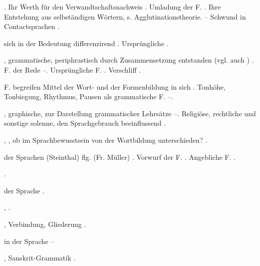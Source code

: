 \begin{register}
.  Ihr Werth für den Verwandtschaftsnachweis \pageref{sp.153}. Umladung der F. \pageref{sp.214}. Ihre Entstehung aus selbständigen Wörtern, s. Agglutinationstheorie. – Schwund in Contactsprachen \pageref{sp.407}.

 sich in der Bedeutung differenzirend \pageref{sp.254}. Ursprüngliche \pageref{sp.361}.

, grammatische, periphrastisch durch   Zusammensetzung entstanden (vgl. auch ) \pageref{sp.241}. F. der Rede \pageref{sp.320}–\pageref{sp.323}. Ursprüngliche F. \pageref{sp.326}. Verschliff \pageref{sp.437}.

  F. begreifen Mittel der Wort- und der Formenbildung in sich \pageref{sp.122}. Tonhöhe, Tonbiegung, Rhythmus, Pausen als grammatische F. \pageref{sp.450}–\pageref{sp.451}.


, graphische, zur Darstellung grammatischer Lehrsätze \pageref{sp.116}–\pageref{sp.119}. Religiöse, rechtliche und sonstige solenne, den Sprachgebrauch beeinflussend \pageref{sp.245}.


, , ob im Sprachbewusstsein von der Wortbildung unterschieden? \pageref{sp.122}.


 der Sprachen (Steinthal) \pageref{sp.337} flg. (Fr. Müller) \pageref{sp.338}. Vorwurf der F. \pageref{sp.364}. Angebliche F. \pageref{sp.393}.

 \pageref{sp.147}.

 der Sprache \pageref{sp.17}.

 \pageref{sp.342}, \pageref{sp.388}.

, Verbindung, Gliederung \pageref{sp.324}.

 in der Sprache \pageref{sp.360}–\pageref{sp.365}



, Sanskrit-Grammatik \pageref{sp.26}.


\end{register}
